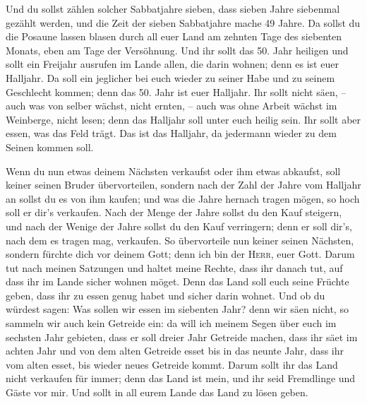  Und du sollst zählen solcher Sabbatjahre sieben, dass
sieben Jahre siebenmal gezählt werden, und die Zeit der sieben
Sabbatjahre mache 49 Jahre.  Da sollst du die Posaune
lassen blasen durch all euer Land am zehnten Tage des siebenten Monats,
eben am Tage der Versöhnung.  Und ihr sollt das 50. Jahr
heiligen und sollt ein Freijahr ausrufen im Lande allen, die darin
wohnen; denn es ist euer Halljahr. Da soll ein jeglicher bei euch wieder
zu seiner Habe und zu seinem Geschlecht kommen;  denn das
50. Jahr ist euer Halljahr. Ihr sollt nicht säen, -- auch was von selber
wächst, nicht ernten, -- auch was ohne Arbeit wächst im Weinberge, nicht
lesen;  denn das Halljahr soll unter euch heilig sein.
Ihr sollt aber essen, was das Feld trägt.  Das ist das
Halljahr, da jedermann wieder zu dem Seinen kommen soll.

 Wenn du nun etwas deinem Nächsten verkaufst oder ihm
etwas abkaufst, soll keiner seinen Bruder übervorteilen, 
sondern nach der Zahl der Jahre vom Halljahr an sollst du es von ihm
kaufen; und was die Jahre hernach tragen mögen, so hoch soll er dir's
verkaufen.  Nach der Menge der Jahre sollst du den Kauf
steigern, und nach der Wenige der Jahre sollst du den Kauf verringern;
denn er soll dir's, nach dem es tragen mag, verkaufen. 
So übervorteile nun keiner seinen Nächsten, sondern fürchte dich vor
deinem Gott; denn ich bin der \textsc{Herr}, euer Gott. 
Darum tut nach meinen Satzungen und haltet meine Rechte, dass ihr danach
tut, auf dass ihr im Lande sicher wohnen möget.  Denn das
Land soll euch seine Früchte geben, dass ihr zu essen genug habet und
sicher darin wohnet.  Und ob du würdest sagen: Was sollen
wir essen im siebenten Jahr? denn wir säen nicht, so sammeln wir auch
kein Getreide ein:  da will ich meinem Segen über euch im
sechsten Jahr gebieten, dass er soll dreier Jahr Getreide machen,
 dass ihr säet im achten Jahr und von dem alten Getreide
esset bis in das neunte Jahr, dass ihr vom alten esset, bis wieder neues
Getreide kommt.  Darum sollt ihr das Land nicht verkaufen
für immer; denn das Land ist mein, und ihr seid Fremdlinge und Gäste vor
mir.  Und sollt in all eurem Lande das Land zu lösen
geben.

